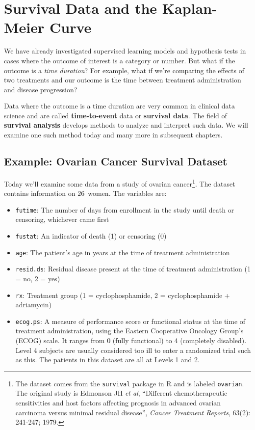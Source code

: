 \chapter{Survival Data and the Kaplan-Meier Curve \label{chapter:km}}

We have already investigated supervised learning models and hypothesis tests in cases where the outcome of interest is a category or number. But what if the outcome is a \emph{time duration}? For example, what if we're comparing the effects of two treatments and our outcome is the time between treatment administration and disease progression?

Data where the outcome is a time duration are very common in clinical data science and are called \textbf{time-to-event} data or \textbf{survival data}. The field of \textbf{survival analysis} develops methods to analyze and interpret such data. We will examine one such method today and many more in subsequent chapters.


\section{Example: Ovarian Cancer Survival Dataset \label{section:ovarian}}

Today we'll examine some data from a study of ovarian cancer\footnote{The dataset comes from the \texttt{survival} package in R and is labeled \texttt{ovarian}. The original study is Edmonson JH \emph{et al}, ``Different chemotherapeutic sensitivities and host factors affecting prognosis in advanced ovarian carcinoma versus minimal residual disease'', \emph{Cancer Treatment Reports}, 63(2): 241-247; 1979.}. The dataset contains information on $26$~women. The variables are:

{\small
\begin{itemize}
\item \texttt{futime}: The number of days from enrollment in the study until death or censoring, whichever came first
\item \texttt{fustat}: An indicator of death (1) or censoring (0)
\item \texttt{age}: The patient's age in years at the time of treatment administration
\item \texttt{resid.ds}: Residual disease present at the time of treatment administration (1 = no, 2 = yes)
\item \texttt{rx}: Treatment group (1 = cyclophosphamide, 2 = cyclophosphamide + adriamycin)
\item \texttt{ecog.ps}: A measure of performance score or functional status at the time of treatment administration, using the Eastern Cooperative Oncology Group's (ECOG) scale. It ranges from 0 (fully functional) to 4 (completely disabled). Level 4 subjects are usually considered too ill to enter a randomized trial such as this. The patients in this dataset are all at Levels 1 and 2. 
\end{itemize}
}

